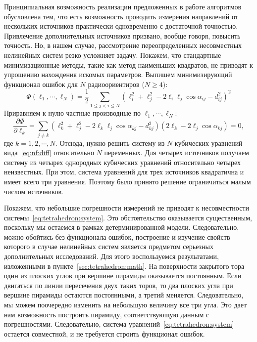 \documentclass[../main.tex]{subfiles}
\begin{document}
\renewcommand{\figurename}{Рисунок}

Принципиальная возможность реализации предложенных в работе алгоритмов обусловлена тем, что есть возможность проводить измерения направлений от нескольких источников практически одновременно с достаточной точностью. Привлечение дополнительных источников призвано, вообще говоря, повысить точность. Но, в нашем случае, рассмотрение переопределенных несовместных нелинейных систем резко усложняет задачу. Покажем, что стандартные минимизационные методы, такие как метод наименьших квадратов, не приводят к упрощению нахождения искомых параметров. Выпишем минимизирующий функционал ошибок для $N$ радиоориентиров ($N \geq 4$):
\begin{equation*}
    \Phi\left(\ell_1, \cdots, \ell_N \right) = \frac{1}{2}\sum_{1 \leq j < i \leq N} \left(\ell_i^2 + \ell_j^2 - 2 \ell_i \ell_j \cos\alpha_{ij} - d_{ij}^2\right)^2
\end{equation*}
Приравняем к нулю частные производные по $\ell_1, \cdots, \ell_N$:
\begin{equation}\label{eq:nf:diff}
      \frac{\partial\Phi}{\partial\ell_k} = \sum_{j \ne k} \left(\ell_k^2 + \ell_j^2 - 2 \ell_k \ell_j \cos\alpha_{kj} - d_{kj}^2\right)\left(2 \ell_k - 2 \ell_j \cos\alpha_{kj}\right) = 0,
\end{equation}
где $k = 1, 2, \cdots, N$. Отсюда, нужно решить систему из $N$ кубических уравнений вида~\eqref{eq:nf:diff} относительно $N$ переменных. Для четырех источников получаем систему из четырех однородных кубических уравнений относительно четырех неизвестных. При этом, система уравнений для трех источников квадратична и имеет всего три уравнения. Поэтому было принято решение ограничиться малым числом источников.

Покажем, что небольшие погрешности измерений не приводят к несовместности системы~\eqref{eq:tetrahedron:system}. Это обстоятельство оказывается существенным, поскольку мы остаемся в рамках детерминированной модели. Следовательно, можно обойтись без функционала ошибок, построение и изучение свойств которого в случае нелинейных систем является предметом серьезных дополнительных исследований. Для этого воспользуемся результатами, изложенными в пункте~\ref{sec:tetrahedron:math}. На поверхности закрытого тора один из плоских углов при вершине пирамиды оказывается постоянным. Если двигаться по линии пересечения двух таких торов, то два плоских угла при вершине пирамиды остаются постоянными, а третий меняется. Следовательно, мы можем поочередно изменить на небольшую величину все три угла. Это дает нам возможность построить пирамиду, соответствующую данным с погрешностями. Следовательно, система уравнений~\eqref{eq:tetrahedron:system} остается совместной, и не требуется строить функционал ошибок.
\end{document}
